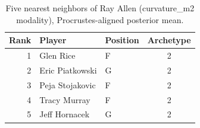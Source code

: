 \begin{table}[htbp]
  \centering\small
  \begin{tabular}{rllc}
    \toprule
    Rank & Player & Position & Archetype \\
    \midrule
    1 & Glen Rice & F & 2 \\
    2 & Eric Piatkowski & G & 2 \\
    3 & Peja Stojakovic & F & 2 \\
    4 & Tracy Murray & F & 2 \\
    5 & Jeff Hornacek & G & 2 \\
    \bottomrule
  \end{tabular}
  \caption{Five nearest neighbors of Ray Allen (curvature_m2 modality), Procrustes-aligned posterior mean.}
  \label{tab:Ray_Allen_neighbors_curvature_m2}
\end{table}

